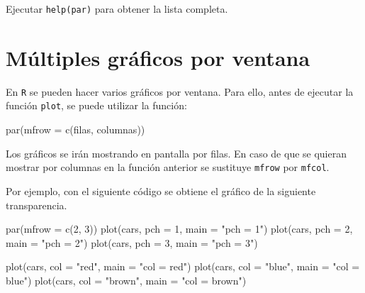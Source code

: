 \documentclass[
]{book}
\newenvironment{Shaded}{\begin{snugshade}}{\end{snugshade}}
\newcommand{\AttributeTok}[1]{\textcolor[rgb]{0.77,0.63,0.00}{#1}}
\newcommand{\DecValTok}[1]{\textcolor[rgb]{0.00,0.00,0.81}{#1}}
\newcommand{\FunctionTok}[1]{\textcolor[rgb]{0.00,0.00,0.00}{#1}}
\newcommand{\NormalTok}[1]{#1}
\newcommand{\StringTok}[1]{\textcolor[rgb]{0.31,0.60,0.02}{#1}}
\theoremstyle{break}
\theoremstyle{nonumberplain}
\begin{document}
Ejecutar \texttt{help(par)} para obtener la lista completa.

\hypertarget{muxfaltiples-gruxe1ficos-por-ventana}{%
\section{Múltiples gráficos por ventana}\label{muxfaltiples-gruxe1ficos-por-ventana}}

En \texttt{R} se pueden
hacer varios gráficos por ventana. Para ello, antes de ejecutar la
función \texttt{plot}, se puede utilizar la función:

\begin{Shaded}
\begin{Highlighting}[]
\FunctionTok{par}\NormalTok{(}\AttributeTok{mfrow =} \FunctionTok{c}\NormalTok{(filas, columnas))}
\end{Highlighting}
\end{Shaded}

Los gráficos se irán mostrando en pantalla por filas. En caso de que se
quieran mostrar por columnas en la función anterior se sustituye \texttt{mfrow}
por \texttt{mfcol}.

Por ejemplo, con el siguiente código se obtiene el gráfico de la
siguiente transparencia.

\begin{Shaded}
\begin{Highlighting}[]
\FunctionTok{par}\NormalTok{(}\AttributeTok{mfrow =} \FunctionTok{c}\NormalTok{(}\DecValTok{2}\NormalTok{, }\DecValTok{3}\NormalTok{))}
\FunctionTok{plot}\NormalTok{(cars, }\AttributeTok{pch =} \DecValTok{1}\NormalTok{, }\AttributeTok{main =} \StringTok{"pch = 1"}\NormalTok{)}
\FunctionTok{plot}\NormalTok{(cars, }\AttributeTok{pch =} \DecValTok{2}\NormalTok{, }\AttributeTok{main =} \StringTok{"pch = 2"}\NormalTok{)}
\FunctionTok{plot}\NormalTok{(cars, }\AttributeTok{pch =} \DecValTok{3}\NormalTok{, }\AttributeTok{main =} \StringTok{"pch = 3"}\NormalTok{)}

\FunctionTok{plot}\NormalTok{(cars, }\AttributeTok{col =} \StringTok{"red"}\NormalTok{, }\AttributeTok{main =} \StringTok{"col = red"}\NormalTok{)}
\FunctionTok{plot}\NormalTok{(cars, }\AttributeTok{col =} \StringTok{"blue"}\NormalTok{, }\AttributeTok{main =} \StringTok{"col = blue"}\NormalTok{)}
\FunctionTok{plot}\NormalTok{(cars, }\AttributeTok{col =} \StringTok{"brown"}\NormalTok{, }\AttributeTok{main =} \StringTok{"col = brown"}\NormalTok{)}
\end{Highlighting}
\end{Shaded}
\end{document}
